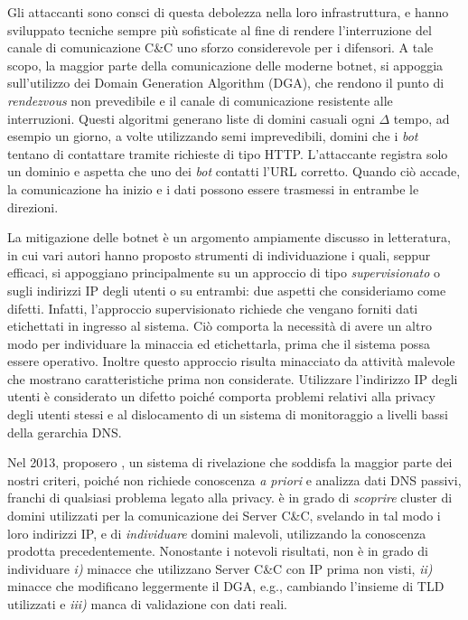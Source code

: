 Gli attaccanti sono consci di questa debolezza nella loro infrastruttura, e hanno
sviluppato tecniche sempre più sofisticate al fine di rendere l'interruzione del
canale di comunicazione C\&C uno sforzo considerevole per i difensori.
A tale scopo, la maggior parte della comunicazione delle moderne botnet,
si appoggia sull'utilizzo dei Domain Generation Algorithm (DGA), che rendono
il punto di \emph{rendezvous} non prevedibile e il canale di comunicazione resistente
alle interruzioni. Questi algoritmi generano liste di domini casuali ogni $\Delta$
tempo, ad esempio un giorno, a volte utilizzando semi imprevedibili, domini che i \emph{bot}
tentano di contattare tramite richieste di tipo HTTP. L'attaccante registra solo un dominio e aspetta che uno dei \emph{bot} contatti l'URL corretto. Quando ciò accade,
la comunicazione ha inizio e i dati possono essere trasmessi in entrambe le direzioni.

La mitigazione delle botnet è un argomento ampiamente discusso in letteratura,
in cui vari autori hanno proposto strumenti di individuazione i quali, seppur
efficaci, si appoggiano principalmente su un approccio di tipo \emph{supervisionato}
o sugli indirizzi IP degli utenti o su entrambi: due aspetti che consideriamo come
difetti. Infatti, l'approccio supervisionato richiede che vengano forniti
dati etichettati in ingresso al sistema. Ciò comporta la necessità di avere un altro
modo per individuare la minaccia ed etichettarla, prima che il sistema possa essere
operativo. Inoltre questo approccio risulta minacciato da attività malevole che
mostrano caratteristiche prima non considerate. Utilizzare l'indirizzo IP degli
utenti è considerato un difetto poiché comporta problemi relativi alla privacy
degli utenti stessi e al dislocamento di un sistema di monitoraggio a livelli bassi
della gerarchia DNS.

Nel 2013, \citet{schiavoni2013} proposero \phoenix, un sistema di rivelazione che
soddisfa la maggior parte dei nostri criteri, poiché non richiede conoscenza
\emph{a priori} e analizza dati DNS passivi, franchi di qualsiasi problema legato
alla privacy. \phoenix è in grado di \emph{scoprire} cluster di domini utilizzati
per la comunicazione dei Server C\&C, svelando in tal modo i loro indirizzi IP,
e di \emph{individuare} domini malevoli, utilizzando la conoscenza prodotta
precedentemente. Nonostante i notevoli risultati, \phoenix non è in grado di
individuare \emph{i)} minacce che utilizzano Server C\&C con IP prima non visti,
\emph{ii)} minacce che modificano leggermente il DGA, e.g., cambiando l'insieme di
TLD utilizzati e \emph{iii)} manca di validazione con dati reali.

